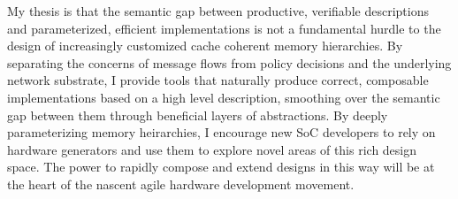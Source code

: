 My thesis is that the semantic gap between productive, verifiable descriptions and parameterized, efficient implementations
is not a fundamental hurdle to the design of increasingly customized cache coherent memory hierarchies.
By separating the concerns of message flows from policy decisions and the underlying network substrate,
I provide tools that naturally produce correct, composable implementations based on a high level description,
smoothing over the semantic gap between them through beneficial layers of abstractions.
By deeply parameterizing memory heirarchies, I encourage new SoC developers to rely on hardware generators
and use them to explore novel areas of this rich design space.
The power to rapidly compose and extend designs in this way will be at the heart of the nascent agile hardware development movement.

